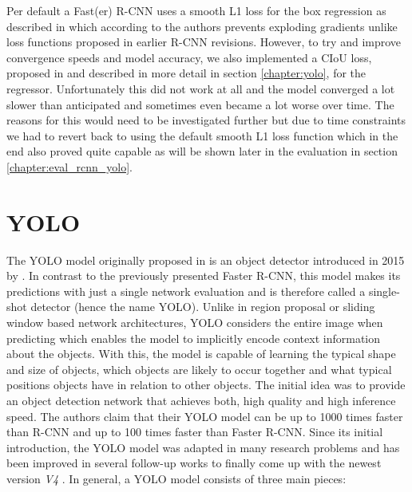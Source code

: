 Per default a Fast(er) R-CNN uses a smooth L1 loss for the box regression as described in \autocite{girshick_fast_2015} which according to the authors prevents exploding gradients unlike loss functions proposed in earlier R-CNN revisions. However, to try and improve convergence speeds and model accuracy, we also implemented a \ac{CIoU} loss, proposed in \autocite{zheng_enhancing_2021} and described in more detail in section \vref{chapter:yolo}, for the regressor. Unfortunately this did not work at all and the model converged a lot slower than anticipated and sometimes even became a lot worse over time. The reasons for this would need to be investigated further but due to time constraints we had to revert back to using the default smooth L1 loss function which in the end also proved quite capable as will be shown later in the evaluation in section \vref{chapter:eval_rcnn_yolo}.

\section{YOLO}\label{chapter:yolo}

The \acf{YOLO} model originally proposed in \autocite{yoloOriginal} is an object detector introduced in 2015 by \citeauthor{yoloOriginal}. In contrast to the previously presented Faster \ac{R-CNN}, this model makes its predictions with just a single network evaluation and is therefore called a single-shot detector (hence the name \ac{YOLO}). Unlike in region proposal or sliding window based network architectures, \ac{YOLO} considers the entire image when predicting which enables the model to implicitly encode context information about the objects. With this, the model is capable of learning the typical shape and size of objects, which objects are likely to occur together and what typical positions objects have in relation to other objects. The initial idea was to provide an object detection network that achieves both, high quality and high inference speed. The authors claim that their \ac{YOLO} model can be up to \num{1000} times faster than \ac{R-CNN} and up to \num{100} times faster than Faster \ac{R-CNN}.
Since its initial introduction, the \ac{YOLO} model was adapted in many research problems and has been improved in several follow-up works \autocite{yolov2} \autocite{yolov3} to finally come up with the newest version \textit{V4} \autocite{yolov4}.
In general, a \ac{YOLO} model consists of three main pieces:

